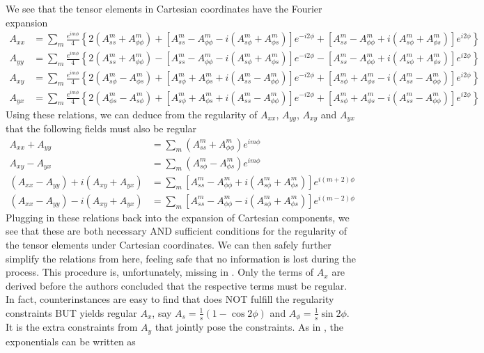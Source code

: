 We see that the tensor elements in Cartesian coordinates have the Fourier expansion
\[\begin{aligned}
    A_{xx} &= \sum_m \frac{e^{im\phi}}{4} \left\{2\left(A_{ss}^m + A_{\phi\phi}^m\right) + \left[A_{ss}^m - A_{\phi\phi}^m - i \left(A_{s\phi}^m + A_{\phi s}^m\right)\right] e^{-i2\phi} + \left[A_{ss}^m - A_{\phi\phi}^m + i \left(A_{s\phi}^m + A_{\phi s}^m\right)\right] e^{i2\phi} \right\} \\ 
    A_{yy} &= \sum_m \frac{e^{im\phi}}{4} \left\{2\left(A_{ss}^m + A_{\phi\phi}^m\right) - \left[A_{ss}^m - A_{\phi\phi}^m - i \left(A_{s\phi}^m + A_{\phi s}^m\right)\right] e^{-i2\phi} - \left[A_{ss}^m - A_{\phi\phi}^m + i \left(A_{s\phi}^m + A_{\phi s}^m\right)\right] e^{i2\phi} \right\} \\ 
    A_{xy} &= \sum_m \frac{e^{im\phi}}{4} \left\{2 \left(A_{s\phi}^m - A_{\phi s}^m\right) + \left[A_{s\phi}^m + A_{\phi s}^m + i \left(A_{ss}^m - A_{\phi\phi}^m\right)\right]e^{-i2\phi} + \left[A_{s\phi}^m + A_{\phi s}^m - i \left(A_{ss}^m - A_{\phi\phi}^m\right)\right]e^{i2\phi}\right\} \\
    A_{yx} &= \sum_m \frac{e^{im\phi}}{4} \left\{2 \left(A_{\phi s}^m - A_{s\phi}^m\right) + \left[A_{s\phi}^m + A_{\phi s}^m + i \left(A_{ss}^m - A_{\phi\phi}^m\right)\right]e^{-i2\phi} + \left[A_{s\phi}^m + A_{\phi s}^m - i \left(A_{ss}^m - A_{\phi\phi}^m\right)\right]e^{i2\phi}\right\}
\end{aligned}\]
Using these relations, we can deduce from the regularity of $A_{xx}$, $A_{yy}$, $A_{xy}$ and $A_{yx}$ that the following fields must also be regular
\[
\begin{aligned}
    A_{xx} + A_{yy} &= \sum_m \left(A_{ss}^m + A_{\phi\phi}^m\right) e^{im\phi} \\ 
    A_{xy} - A_{yx} &= \sum_m \left(A_{s\phi}^m - A_{\phi s}^m\right) e^{im\phi} \\ 
    \left(A_{xx} - A_{yy}\right) + i \left(A_{xy} + A_{yx}\right) &= \sum_m \left[A_{ss}^m - A_{\phi\phi}^m + i \left(A_{s\phi}^m + A_{\phi s}^m\right)\right] e^{i(m+2)\phi} \\
    \left(A_{xx} - A_{yy}\right) - i \left(A_{xy} + A_{yx}\right) &= \sum_m \left[A_{ss}^m - A_{\phi\phi}^m - i \left(A_{s\phi}^m + A_{\phi s}^m\right)\right] e^{i(m-2)\phi}
\end{aligned}
\]
Plugging in these relations back into the expansion of Cartesian components, we see that these are both necessary AND sufficient conditions for the regularity of the tensor elements under Cartesian coordinates. We can then safely further simplify the relations from here, feeling safe that no information is lost during the process. This procedure is, unfortunately, missing in \textcite{lewis_physical_1990}. Only the terms of $A_x$ are derived before the authors concluded that the respective terms must be regular. In fact, counterinstances are easy to find that does NOT fulfill the regularity constraints BUT yields regular $A_x$, say $A_s = \frac{1}{s} \left(1 - \cos 2\phi\right)$ and $A_\phi = \frac{1}{s} \sin 2\phi$. It is the extra constraints from $A_y$ that jointly pose the constraints. As in \textcite{lewis_physical_1990}, the exponentials can be written as

